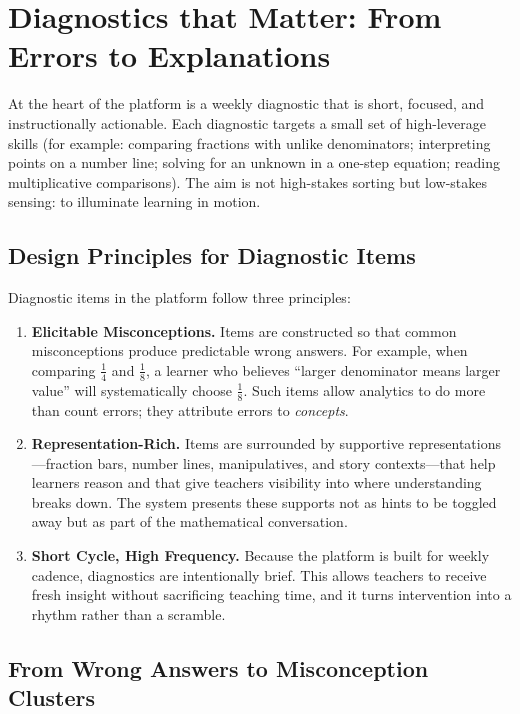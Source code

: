 \section{Diagnostics that Matter: From Errors to Explanations}

At the heart of the platform is a weekly diagnostic that is short, focused, and instructionally actionable. Each diagnostic targets a small set of high-leverage skills (for example: comparing fractions with unlike denominators; interpreting points on a number line; solving for an unknown in a one-step equation; reading multiplicative comparisons). The aim is not high-stakes sorting but low-stakes sensing: to illuminate learning in motion.

\subsection{Design Principles for Diagnostic Items}

Diagnostic items in the platform follow three principles:

\begin{enumerate}
  \item \textbf{Elicitable Misconceptions.} Items are constructed so that common misconceptions produce predictable wrong answers. For example, when comparing $\tfrac{1}{4}$ and $\tfrac{1}{8}$, a learner who believes “larger denominator means larger value” will systematically choose $\tfrac{1}{8}$. Such items allow analytics to do more than count errors; they attribute errors to \emph{concepts}.
  \item \textbf{Representation-Rich.} Items are surrounded by supportive representations---fraction bars, number lines, manipulatives, and story contexts---that help learners reason and that give teachers visibility into where understanding breaks down. The system presents these supports not as hints to be toggled away but as part of the mathematical conversation.
  \item \textbf{Short Cycle, High Frequency.} Because the platform is built for weekly cadence, diagnostics are intentionally brief. This allows teachers to receive fresh insight without sacrificing teaching time, and it turns intervention into a rhythm rather than a scramble.
\end{enumerate}

\subsection{From Wrong Answers to Misconception Clusters}


